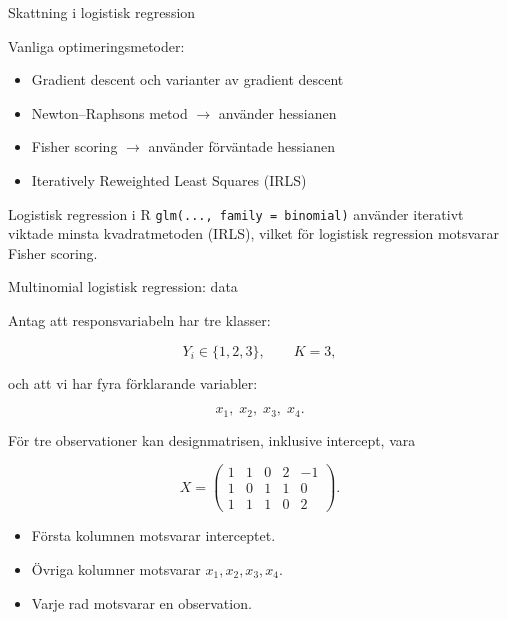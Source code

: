 \documentclass[10pt,english]{beamer}
\begin{document}
\begin{frame}{Skattning i logistisk regression}

Vanliga optimeringsmetoder:

\begin{itemize}
    \item Gradient descent och varianter av gradient descent
    \item Newton--Raphsons metod $\rightarrow$ använder hessianen
    \item Fisher scoring $\rightarrow$ använder förväntade hessianen
    \item Iteratively Reweighted Least Squares (IRLS)
\end{itemize}

\begin{block}{Logistisk regression i R}
\texttt{glm(..., family = binomial)} använder iterativt viktade
minsta kvadratmetoden (IRLS), vilket för logistisk regression
motsvarar Fisher scoring.
\end{block}

\end{frame}



\begin{frame}{Multinomial logistisk regression: data}

    Antag att responsvariabeln har tre klasser:

    \[
        Y_i \in \{1,2,3\},
        \qquad
        K=3,
    \]

    och att vi har fyra förklarande variabler:

    \[
        x_1,\;x_2,\;x_3,\;x_4.
    \]

    \medskip

    För tre observationer kan designmatrisen, inklusive intercept, vara

    \[
        X
        =
        \begin{pmatrix}
            1 & 1 & 0 & 2 & -1 \\
            1 & 0 & 1 & 1 &  0 \\
            1 & 1 & 1 & 0 &  2
        \end{pmatrix}.
    \]

    \begin{itemize}
        \item Första kolumnen motsvarar interceptet.
        \item Övriga kolumner motsvarar \(x_1,x_2,x_3,x_4\).
        \item Varje rad motsvarar en observation.
    \end{itemize}

\end{frame}
\end{document}

